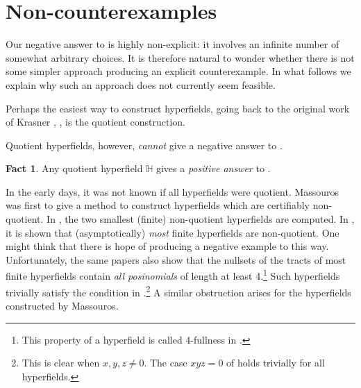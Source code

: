 \documentclass[reqno]{amsart}
\theoremstyle{definition}
\newtheorem{Df}[Thm]{Definition}
\newtheorem*{fact}{Fact}
\theoremstyle{remark}
\begin{document}
\section{Non-counterexamples}\label{sec:difficulty}

Our negative answer to  is highly non-explicit: it involves an infinite number of somewhat arbitrary choices. It is therefore natural to wonder whether there is not some simpler approach producing an explicit counterexample. In what follows we explain why such an approach does not  currently seem feasible.

Perhaps the easiest way to construct hyperfields, going back to the original work of Krasner \cite{Krasner56}, \cite{Krasner83}, is the quotient construction.
Quotient hyperfields, however, \emph{cannot} give a negative answer to .
\begin{fact}
    Any quotient hyperfield $\mathbb{H}$ gives a \emph{positive answer} to .
\end{fact}
In the early days, it was not known if all hyperfields were quotient. Massouros \cite{Massouros} was first to give a method to construct hyperfields which are certifiably non-quotient. In \cite{Jin}, the two smallest (finite) non-quotient hyperfields are computed. In \cites{hobby, le26}, it is shown that (asymptotically) \emph{most} finite hyperfields are non-quotient. One might think that there is hope of producing a negative example to  this way. Unfortunately, the same papers also show that the nullsets of the tracts of most finite hyperfields contain \emph{all posinomials} of length at least 4.\footnote{This property of a hyperfield is called 4-fullness in \cite{le26}.} Such hyperfields trivially satisfy the condition in .\footnote{This is clear when $x,y,z \neq 0$. The case $xyz = 0$ of  holds trivially for all hyperfields.} A similar obstruction arises for the hyperfields constructed by Massouros.
\end{document}
